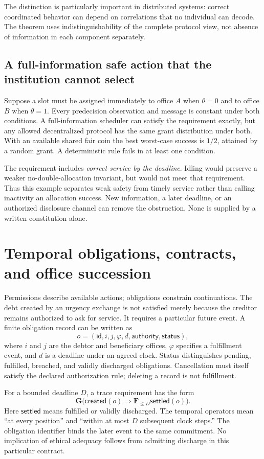 \documentclass[11pt,letterpaper]{article}
\theoremstyle{plain}
\theoremstyle{definition}
\theoremstyle{remark}
\begin{document}
The distinction is particularly important in distributed systems: correct coordinated behavior can depend on correlations that no individual can decode. The theorem uses indistinguishability of the complete protocol view, not absence of information in each component separately.

\subsection{A full-information safe action that the institution cannot select}
Suppose a slot must be assigned immediately to office $A$ when $\theta=0$ and to office $B$ when $\theta=1$. Every predecision observation and message is constant under both conditions. A full-information scheduler can satisfy the requirement exactly, but any allowed decentralized protocol has the same grant distribution under both. With an available shared fair coin the best worst-case success is $1/2$, attained by a random grant. A deterministic rule fails in at least one condition.

The requirement includes \emph{correct service by the deadline}. Idling would preserve a weaker no-double-allocation invariant, but would not meet that requirement. Thus this example separates weak safety from timely service rather than calling inactivity an allocation success. New information, a later deadline, or an authorized disclosure channel can remove the obstruction. None is supplied by a written constitution alone.


\section{Temporal obligations, contracts, and office succession}\label{sec:obligations}
Permissions describe available actions; obligations constrain continuations. The debt created by an urgency exchange is not satisfied merely because the creditor remains authorized to ask for service. It requires a particular future event. A finite obligation record can be written as
\[
o=(\mathsf{id},i,j,\varphi,d,\mathsf{authority},\mathsf{status}),
\]
where $i$ and $j$ are the debtor and beneficiary offices, $\varphi$ specifies a fulfillment event, and $d$ is a deadline under an agreed clock. Status distinguishes pending, fulfilled, breached, and validly discharged obligations. Cancellation must itself satisfy the declared authorization rule; deleting a record is not fulfillment.

For a bounded deadline $D$, a trace requirement has the form
\[
\mathbf G\bigl(\mathsf{created}(o)\Rightarrow
\mathbf F_{\leq D}\mathsf{settled}(o)\bigr).
\]
Here $\mathsf{settled}$ means fulfilled or validly discharged. The temporal operators mean ``at every position'' and ``within at most $D$ subsequent clock steps.'' The obligation identifier binds the later event to the same commitment. No implication of ethical adequacy follows from admitting discharge in this particular contract.
\end{document}
